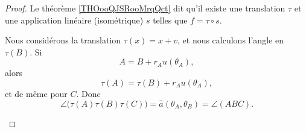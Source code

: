 \begin{proof}
	Le théorème \ref{THOooQJSRooMrqQct} dit qu'il existe une translation \( \tau\) et une application linéaire (isométrique) \( s\) telles que \( f=\tau\circ s\).
	\begin{subproof}
		\spitem[Translation]
		Nous considérons la translation \( \tau(x)=x+v\), et nous calculons l'angle en \( \tau(B)\). Si
		\begin{equation}
			A=B+r_Au(\theta_A),
		\end{equation}
		alors
		\begin{equation}
			\tau(A)=\tau(B)+r_Au(\theta_A),
		\end{equation}
		et de même pour \( C\). Donc
		\begin{equation}
			\angle\big( \tau(A)\tau(B)\tau(C) \big)=\hat a(\theta_A,\theta_B)=\angle(ABC).
		\end{equation}


\end{subproof}
\end{proof}
